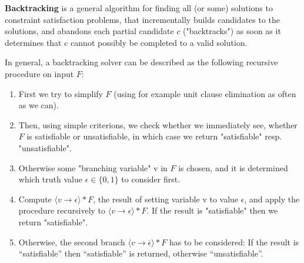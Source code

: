 \documentclass[12pt]{book}
\begin{document}
\begin{defi}\label{def:bsat} \textbf{Backtracking} is a general algorithm for finding all (or some) solutions to constraint satisfaction problems, 
      that incrementally builds candidates to the solutions, and abandons each partial candidate $c$ ("backtracks") as soon as it determines that c cannot 
      possibly be completed to a valid solution. 

      In general, a backtracking solver can be described as the following recursive procedure on input $F$:
      \begin{enumerate}
            \item First we try to simplify $F$ (using for example unit clause elimination as often as we can).
            \item Then, using simple criterions, we check whether we immediately see, whether $F$ is satisfiable or
            unsatisfiable, in which case we return "satisfiable" resp. "unsatisfiable".
            \item Otherwise some "branching variable" v in $F$ is chosen, and it is determined which truth value $\epsilon \in \{ 0, 1\}$ to consider first.
            \item Compute $\langle v \to \epsilon \rangle * F$, the result of setting variable v to value $\epsilon$, and apply the procedure recursively to
            $\langle v \to \epsilon \rangle * F$. If the result is "satisfiable" then we return "satisfiable".
            \item Otherwise, the second branch $\langle v \to \overline{\epsilon} \rangle * F$ has to be considered: If the result is “satisfiable” then
            “satisfiable” is returned, otherwise “unsatisfiable”.
      \end{enumerate}
\end{defi}
\end{document}
